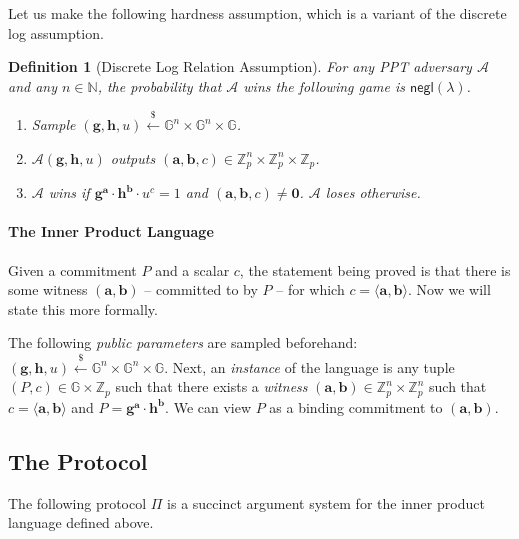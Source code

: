 \documentclass[11pt]{article}
\newtheorem{definition}[theorem]{Definition}
\numberwithin{equation}{section}
\newcommand{\bfa}{\mathbf{a}}
\newcommand{\bfb}{\mathbf{b}}
\newcommand{\bfg}{\mathbf{g}}
\newcommand{\bfh}{\mathbf{h}}
\newcommand{\bbG}{\mathbb{G}}
\newcommand{\bbN}{\mathbb{N}}
\newcommand{\bbZ}{\mathbb{Z}}
\newcommand{\cA}{\mathcal{A}}
\newcommand{\secp}{\lambda}
\newcommand{\negl}{\mathsf{negl}}
\newcommand{\getsr}{\stackrel{\$}{\gets}}
\begin{document}
Let us make the following hardness assumption, which is a variant of the discrete log assumption.
\begin{definition}[Discrete Log Relation Assumption]\label{def:discrete-log-relation-assumption}
    For any PPT adversary $\cA$ and any $n \in \bbN$, the probability that $\cA$ wins the following game is $\negl(\secp)$.
    \begin{enumerate}
        \item Sample $(\bfg, \bfh, u) \getsr \bbG^{n} \times \bbG^n \times \bbG$.
        \item $\cA(\bfg, \bfh, u)$ outputs $(\bfa, \bfb, c) \in \bbZ_p^{n} \times \bbZ_p^n \times \bbZ_p$. 
        \item $\cA$ wins if $\bfg^{\bfa} \cdot \bfh^\bfb \cdot u^c = 1$ 
        and $(\bfa, \bfb, c) \neq \mathbf{0}$. $\cA$ loses otherwise.
    \end{enumerate}
\end{definition}

\paragraph{The Inner Product Language} Given a commitment $P$ and a scalar $c$, the statement being proved is that there is some witness $(\bfa, \bfb)$ -- committed to by $P$ -- for which $c = \langle \bfa, \bfb \rangle$. Now we will state this more formally.

The following \textit{public parameters} are sampled beforehand: $(\bfg, \bfh, u) \getsr \bbG^{n} \times \bbG^{n} \times \bbG$. Next, an \textit{instance} of the language is any tuple $(P, c) \in \bbG \times \bbZ_p$ such that there exists a \textit{witness} $(\bfa, \bfb) \in \bbZ_p^{n} \times \bbZ_p^n$ such that $c = \langle \bfa, \bfb \rangle$ and $P = \bfg^\bfa \cdot \bfh^\bfb$. We can view $P$ as a binding commitment to $(\bfa, \bfb)$.

\subsection{The Protocol}
The following protocol $\Pi$ is a succinct argument system for the inner product language defined above.
\end{document}
